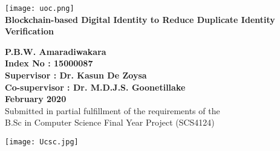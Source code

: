 \begin{titlepage}
    \begin{center}

        \texttt{[image: uoc.png]}\\
        \vspace{24pt}
        \textbf{\Huge{Blockchain-based Digital Identity to Reduce Duplicate Identity Verification}}


        \vspace{36pt}
        \textbf{{\Large{P.B.W. Amaradiwakara}}}\\
        \textbf{{\Large{Index No : 15000087}}}\\

        \vspace{36pt}
        \textbf{{\Large{Supervisor : Dr. Kasun De Zoysa}}}\\
        \textbf{{\Large{Co-supervisor : Dr. M.D.J.S. Goonetillake}}}\\

        \vspace{60pt}
        \textbf{{\Large{February 2020}}}\\
        
        \vspace{12pt}
        \singlespacing
        \large {Submitted in partial fulfillment of the requirements of the}\\
        \large {B.Sc in Computer Science Final Year Project (SCS4124)}
        
        \vspace{24pt}
        \texttt{[image: Ucsc.jpg]}\\

    \end{center}
\end{titlepage}
